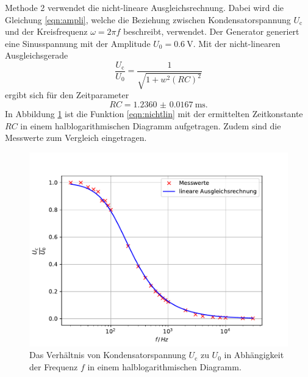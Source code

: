Methode 2 verwendet die nicht-lineare Ausgleichsrechnung.
Dabei wird die Gleichung \ref{eqn:ampli}, welche die Beziehung zwischen Kondensatorspannung $U_\text{c}$ und der Kreisfrequenz $\omega = 2 \pi f$ beschreibt, verwendet.
Der Generator generiert eine Sinusspannung mit der Amplitude $U_0 = \SI{0.6}{\volt}$.
Mit der nicht-linearen Ausgleichsgerade
\begin{equation}
    \frac{U_\text{c}}{U_0} = \frac{1}{\sqrt{1+w^2(RC)^2}}
    \label{eqn:nichtlin}
\end{equation}
ergibt sich für den Zeitparameter
\begin{equation*}
    RC = \SI{1.2360(167)}{\milli\second} .
\end{equation*}
In Abbildung \ref{fig:spannung} ist die Funktion \ref{eqn:nichtlin} mit der ermittelten Zeitkonstante $RC$ in einem halblogarithmischen Diagramm aufgetragen.
Zudem sind die Messwerte zum Vergleich eingetragen.
\begin{figure}
    \label{fig:spannung}
    \centering
    \includegraphics[width=\textwidth]{content/data/plotb.pdf}
    \caption{Das Verhältnis von Kondensatorspannung $U_\text{c}$ zu $U_0$ in Abhängigkeit der Frequenz $f$ in einem halblogarithmischen Diagramm.}
\end{figure}

